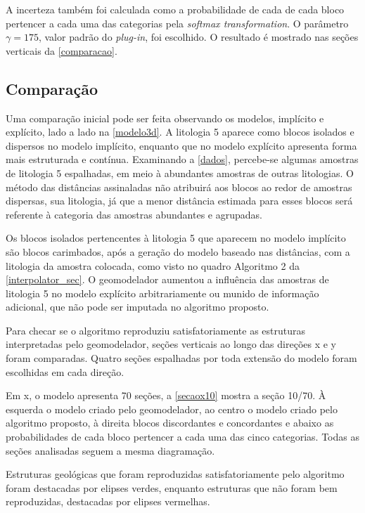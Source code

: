 A incerteza também foi calculada como a probabilidade de cada de cada bloco pertencer a cada uma das categorias pela \textit{softmax transformation}. O parâmetro $\gamma=175$, valor padrão do \textit{plug-in}, foi escolhido. O resultado é mostrado nas seções verticais da \autoref{comparacao}.

\subsection{Comparação}\label{comparacao}

Uma comparação inicial pode ser feita observando os modelos, implícito e explícito, lado a lado na \autoref{modelo3d}. A litologia 5 aparece como blocos isolados e dispersos no modelo implícito, enquanto que no modelo explícito apresenta forma mais estruturada e contínua. Examinando a \autoref{dados}, percebe-se algumas amostras de litologia 5 espalhadas, em meio à abundantes amostras de outras litologias. O método das distâncias assinaladas não atribuirá aos blocos ao redor de amostras dispersas, sua litologia, já que a menor distância estimada para esses blocos será referente à categoria das amostras abundantes e agrupadas.

Os blocos isolados pertencentes à litologia 5 que aparecem no modelo implícito são blocos carimbados, após a geração do modelo baseado nas distâncias, com a litologia da amostra colocada, como visto no quadro Algoritmo 2 da \autoref{interpolator_sec}. O geomodelador aumentou a influência das amostras de litologia 5 no modelo explícito arbitrariamente ou munido de informação adicional, que não pode ser imputada no algoritmo proposto.

Para checar se o algoritmo reproduziu satisfatoriamente as estruturas interpretadas pelo geomodelador, seções verticais ao longo das direções x e y foram comparadas. Quatro seções espalhadas por toda extensão do modelo foram escolhidas em cada direção. 

Em x, o modelo apresenta 70 seções, a \autoref{secaox10} mostra a seção 10/70. À esquerda o modelo criado pelo geomodelador, ao centro o modelo criado pelo algoritmo proposto, à  direita blocos discordantes e concordantes e abaixo as probabilidades de cada bloco pertencer a cada uma das cinco categorias. Todas as seções analisadas seguem a mesma diagramação. 

Estruturas geológicas que foram reproduzidas satisfatoriamente pelo algoritmo foram destacadas por elipses verdes, enquanto estruturas que não foram bem reproduzidas, destacadas por elipses vermelhas.


